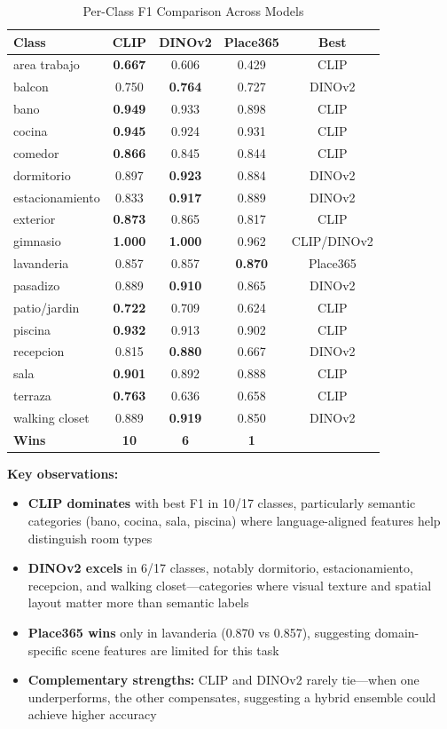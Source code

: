 \documentclass[conference]{IEEEtran}
\begin{document}
\begin{table}[htbp]
\caption{Per-Class F1 Comparison Across Models}
\begin{center}
\small
\begin{tabular}{@{}lccc c@{}}
\toprule
\textbf{Class} & \textbf{CLIP} & \textbf{DINOv2} & \textbf{Place365} & \textbf{Best} \\
\midrule
area trabajo & \textbf{0.667} & 0.606 & 0.429 & CLIP \\
balcon & 0.750 & \textbf{0.764} & 0.727 & DINOv2 \\
bano & \textbf{0.949} & 0.933 & 0.898 & CLIP \\
cocina & \textbf{0.945} & 0.924 & 0.931 & CLIP \\
comedor & \textbf{0.866} & 0.845 & 0.844 & CLIP \\
dormitorio & 0.897 & \textbf{0.923} & 0.884 & DINOv2 \\
estacionamiento & 0.833 & \textbf{0.917} & 0.889 & DINOv2 \\
exterior & \textbf{0.873} & 0.865 & 0.817 & CLIP \\
gimnasio & \textbf{1.000} & \textbf{1.000} & 0.962 & CLIP/DINOv2 \\
lavanderia & 0.857 & 0.857 & \textbf{0.870} & Place365 \\
pasadizo & 0.889 & \textbf{0.910} & 0.865 & DINOv2 \\
patio/jardin & \textbf{0.722} & 0.709 & 0.624 & CLIP \\
piscina & \textbf{0.932} & 0.913 & 0.902 & CLIP \\
recepcion & 0.815 & \textbf{0.880} & 0.667 & DINOv2 \\
sala & \textbf{0.901} & 0.892 & 0.888 & CLIP \\
terraza & \textbf{0.763} & 0.636 & 0.658 & CLIP \\
walking closet & 0.889 & \textbf{0.919} & 0.850 & DINOv2 \\
\midrule
\textbf{Wins} & \textbf{10} & \textbf{6} & \textbf{1} & \\
\bottomrule
\end{tabular}
\label{tab:perclass_compare}
\end{center}
\end{table}

\textbf{Key observations:}
\begin{itemize}
\item \textbf{CLIP dominates} with best F1 in 10/17 classes, particularly semantic categories (bano, cocina, sala, piscina) where language-aligned features help distinguish room types
\item \textbf{DINOv2 excels} in 6/17 classes, notably dormitorio, estacionamiento, recepcion, and walking closet---categories where visual texture and spatial layout matter more than semantic labels
\item \textbf{Place365 wins} only in lavanderia (0.870 vs 0.857), suggesting domain-specific scene features are limited for this task
\item \textbf{Complementary strengths:} CLIP and DINOv2 rarely tie---when one underperforms, the other compensates, suggesting a hybrid ensemble could achieve higher accuracy
\end{itemize}
\end{document}
